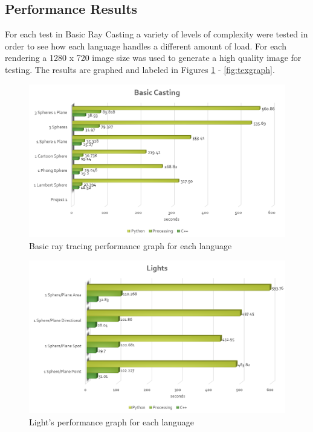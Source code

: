 \subsection{Performance Results}
For each test in Basic Ray Casting a variety of levels of complexity were tested in order to see how each language handles a different amount of load.  For each rendering a 1280 x 720 image size was used to generate a high quality image for testing.  The results are graphed and labeled in Figures \ref{fig:basicgraph} - \ref{fig:texgraph}.
\begin{figure}[ht]
\centering
\includegraphics[width=\textwidth]{figures/graphs/basic-graph.png}
\caption{Basic ray tracing performance graph for each language}
\label{fig:basicgraph}
\end{figure}

\begin{figure}[ht]
\centering
\includegraphics[width=\textwidth]{figures/graphs/lights-graph.png}
\caption{Light's performance graph for each language}
\label{fig:lightsgraph}
\end{figure}

